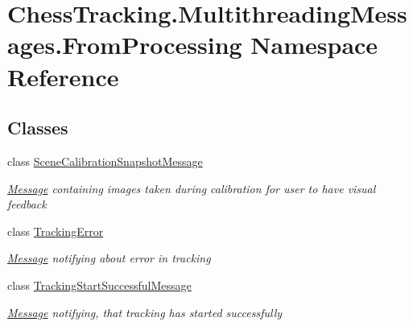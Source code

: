 \hypertarget{namespace_chess_tracking_1_1_multithreading_messages_1_1_from_processing}{}\section{Chess\+Tracking.\+Multithreading\+Messages.\+From\+Processing Namespace Reference}
\label{namespace_chess_tracking_1_1_multithreading_messages_1_1_from_processing}
\subsection*{Classes}
\begin{DoxyCompactItemize}
\item 
class \mbox{\hyperlink{class_chess_tracking_1_1_multithreading_messages_1_1_from_processing_1_1_scene_calibration_snapshot_message}{Scene\+Calibration\+Snapshot\+Message}}
\begin{DoxyCompactList}\small\item\em \mbox{\hyperlink{class_chess_tracking_1_1_multithreading_messages_1_1_message}{Message}} containing images taken during calibration for user to have visual feedback \end{DoxyCompactList}\item 
class \mbox{\hyperlink{class_chess_tracking_1_1_multithreading_messages_1_1_from_processing_1_1_tracking_error}{Tracking\+Error}}
\begin{DoxyCompactList}\small\item\em \mbox{\hyperlink{class_chess_tracking_1_1_multithreading_messages_1_1_message}{Message}} notifying about error in tracking \end{DoxyCompactList}\item 
class \mbox{\hyperlink{class_chess_tracking_1_1_multithreading_messages_1_1_from_processing_1_1_tracking_start_successful_message}{Tracking\+Start\+Successful\+Message}}
\begin{DoxyCompactList}\small\item\em \mbox{\hyperlink{class_chess_tracking_1_1_multithreading_messages_1_1_message}{Message}} notifying, that tracking has started successfully \end{DoxyCompactList}\end{DoxyCompactItemize}
